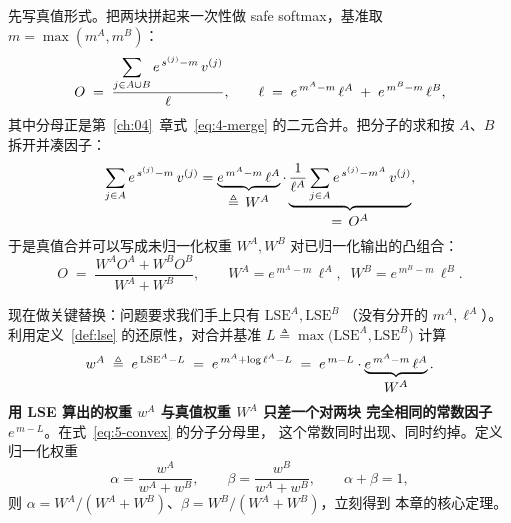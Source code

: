 先写真值形式。把两块拼起来一次性做 safe softmax，基准取
$m = \max(m^{A}, m^{B})$：
\begin{equation}
  O \;=\; \frac{\displaystyle\sum\sb{j \in A \cup B} e^{\,s^{(j)} - m}\, v^{(j)}}
               {\displaystyle\ell}, \qquad
  \ell \;=\; e^{\,m^{A} - m}\,\ell^{A} \;+\; e^{\,m^{B} - m}\,\ell^{B} ,
  \label{eq:5-merge-true}
\end{equation}
其中分母正是第~\ref{ch:04}~章式~\ref{eq:4-merge} 的二元合并。把分子的求和按
$A$、$B$ 拆开并凑因子：
\begin{equation}
  \sum\sb{j \in A} e^{\,s^{(j)} - m}\, v^{(j)}
  = \underbrace{e^{\,m^{A} - m}\,\ell^{A}}\sb{\textstyle \triangleq\, W^{A}}
    \cdot \underbrace{\frac{1}{\ell^{A}} \sum\sb{j \in A} e^{\,s^{(j)} - m^{A}}\, v^{(j)}}\sb{\textstyle =\, O^{A}} ,
  \label{eq:5-split}
\end{equation}
于是真值合并可以写成未归一化权重 $W^{A}, W^{B}$ 对已归一化输出的凸组合：
\begin{equation}
  O \;=\; \frac{W^{A} O^{A} + W^{B} O^{B}}{W^{A} + W^{B}},
  \qquad W^{A} = e^{\,m^{A} - m}\,\ell^{A}, \;\;
          W^{B} = e^{\,m^{B} - m}\,\ell^{B} .
  \label{eq:5-convex}
\end{equation}

现在做关键替换：问题要求我们手上只有 $\mathrm{LSE}^{A}, \mathrm{LSE}^{B}$
（没有分开的 $m^{A}, \ell^{A}$）。利用定义~\ref{def:lse} 的还原性，对合并基准
$L \triangleq \max\bigl(\mathrm{LSE}^{A}, \mathrm{LSE}^{B}\bigr)$ 计算
\begin{equation}
  w^{A} \;\triangleq\; e^{\,\mathrm{LSE}^{A} - L}
         \;=\; e^{\,m^{A} + \log \ell^{A} - L}
         \;=\; e^{\,m - L} \cdot \underbrace{e^{\,m^{A} - m}\,\ell^{A}}\sb{\textstyle W^{A}} .
  \label{eq:5-key}
\end{equation}
\textbf{用 LSE 算出的权重 $w^{A}$ 与真值权重 $W^{A}$ 只差一个对两块
完全相同的常数因子 $e^{\,m - L}$}。在式~\ref{eq:5-convex} 的分子分母里，
这个常数同时出现、同时约掉。定义归一化权重
\begin{equation}
  \alpha = \frac{w^{A}}{w^{A} + w^{B}}, \qquad
  \beta  = \frac{w^{B}}{w^{A} + w^{B}}, \qquad \alpha + \beta = 1 ,
  \label{eq:5-alpha-beta}
\end{equation}
则 $\alpha = W^{A}/(W^{A}+W^{B})$、$\beta = W^{B}/(W^{A}+W^{B})$，立刻得到
本章的核心定理。

